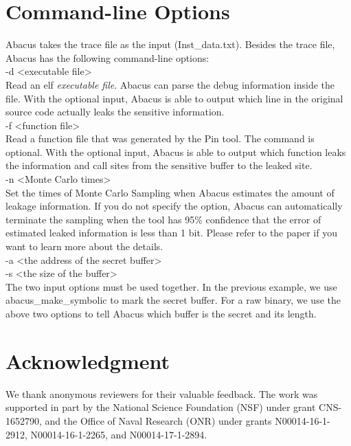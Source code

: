 \documentclass[10pt,conference]{IEEEtran}
\newcommand{\tool}{\textsf{Abacus}}
\begin{document}
\section{Command-line Options}
\tool{} takes the trace file as the input (\textsf{Inst\_data.txt}). Besides the trace file, \tool{} has the following command-line options:
\vspace{6pt}
\\\textsf{-d {<executable file>}}
\\ Read an elf \textit{executable file}. \tool{} can parse the debug information inside the file. With the optional input, \tool{} is able to output which line in the original source code actually leaks the sensitive information.
\vspace{6pt}
\\\textsf{-f {<function file>}}
\\Read a function file that was generated by the Pin tool. The command is optional. With the optional input, \tool{} is able to output which function leaks the information and call sites from the sensitive buffer to the leaked site.
\vspace{6pt}
\\\textsf{-n {<Monte Carlo times>}}
\\ Set the times of Monte Carlo Sampling when \tool{} estimates the amount of leakage information. If you do not specify the option, \tool{} can automatically terminate the sampling when the tool has 95\% confidence that the error of estimated leaked information is less than 1 bit. Please refer to the paper if you want to learn more about the details.
\vspace{6pt}
\\\textsf{-a {<the address of the secret buffer>} \\-s {<the size of the buffer>}}
\\The two input options must be used together. In the previous example, we use \textsf{abacus\_make\_symbolic} to mark the secret buffer. For a raw binary, we use the above two options to tell \tool{} which buffer is the secret and its length.



\section*{Acknowledgment}

We thank anonymous reviewers for their valuable feedback. 
The work was supported in part by the National Science Foundation (NSF) under grant CNS-1652790, and the Office of Naval Research (ONR) under grants N00014-16-1-2912, N00014-16-1-2265, and N00014-17-1-2894. 




\end{document}
